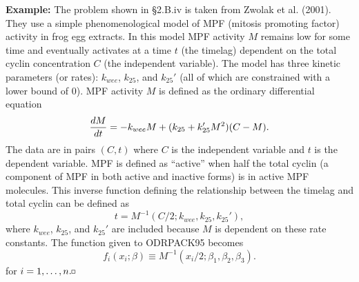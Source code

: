 \h{\bf Example:} The problem shown in \S 2.B.iv is taken from Zwolak
et al.  (2001).  They use a simple phenomenological model of MPF (mitosis
promoting factor) activity in frog egg extracts.  In this model MPF
activity $M$ remains low for some time and eventually activates at a
time $t$ (the timelag) dependent on the total cyclin concentration $C$ (the
independent variable).  The model has three kinetic parameters
(or rates): $k_{wee}$, $k_{25}$, and $k_{25}'$ (all of which are constrained
with a lower bound of 0).  MPF activity $M$ is defined as
the ordinary differential equation
$$
{dM \over dt} = -k_{wee}M+(k_{25}+k_{25}'M^2)(C-M).
$$
The data are in pairs $(C,t)$ where $C$ is the independent variable and $t$ is 
the dependent variable.  MPF is defined as
``active'' when half the total cyclin (a component of MPF in both active and
inactive forms) is in active MPF molecules.  This inverse function defining the
relationship between the timelag and total cyclin can be defined as
$$
t = M^{-1}(C / 2; k_{wee}, k_{25}, k_{25}'),
$$
where $k_{wee}$, $k_{25}$, and $k_{25}'$ are included because $M$ is dependent
on these rate constants.
The function given to ODRPACK95 becomes
$$
f_i(x_i;\beta) \equiv M^{-1}(x_i/2; \beta_1, \beta_2, \beta_3).
$$
for $i=1,\ldots, n.\hfill\square$

